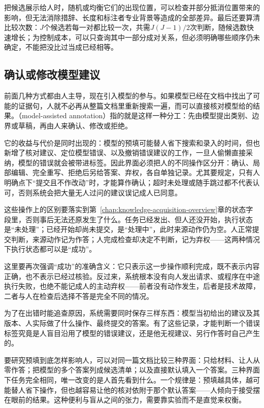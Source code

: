 把候选展示给人时，随机或均衡它们的出现位置，可以检查并部分抵消位置带来的影响，但无法消除措辞、长度和标注者专业背景等造成的全部差异。最后还要算清比较次数：$J$个候选若每一对都比较一次，共需$J(J-1)/2$次判断，随候选数快速增长；为控制成本，可以只查询其中一部分成对关系，但必须明确哪些顺序仍未确定，不能把没比过当成已经相等。

\subsection{确认或修改模型建议}
\label{sec:knowledge-acquisition-human-model-suggestion}

前面几种方式都由人主导，现在引入模型的参与。如果模型已经在文档中找出了可能的证据句，人就不必再从整篇文档里重新搜索一遍，而可以直接核对模型给的结果。（model-assisted annotation）指的就是这样一种分工：先由模型提出类别、边界或草稿，再由人来确认、修改或拒绝。

它的收益与代价是同时出现的：模型的预填可能替人省下搜索和录入的时间，但也新增了核对建议、定位模型错误、以及撤销错误建议的工作，一旦人偷懒直接采纳，模型的错误就会被带进标签。因此界面必须把人的不同操作区分开：确认、局部编辑、完全重写、拒绝后另给答案、弃权，各自单独记录。尤其要规定，只有人明确点下“提交且不作改动”时，才能算作确认；超时未处理或随手跳过都不代表认可，否则系统会把大量无人过问的建议误记成人已同意。

这些操作上的区别要落实到第~\ref{chap:knowledge-acquisition-overview}章的状态字段里，否则事后无法还原发生了什么。任务已经发出、但人还没开始，执行状态是“未处理”；已经开始却尚未提交，是“处理中”，此时来源动作仍为空。人正常提交判断，来源动作记为作答；人完成检查却决定不判断，记为弃权——这两种情况下执行状态都可以是“成功”。

这里要再次强调“成功”的准确含义：它只表示这一步操作顺利完成，既不表示内容正确，也不表示已经过核验。反过来，系统根本没有向人发出请求、或程序在中途执行失败，也绝不能记成人的主动弃权——前者没有动作发生，后者是技术故障，二者与人在检查后选择不答是完全不同的情况。

为了在出错时能追查原因，系统需要同时保存三样东西：模型当初给出的建议及其版本、人实际做了什么操作、最终提交的答案。有了这些记录，才能判断一个错误标签究竟是人盲目沿用了模型的错误建议，还是他无视建议、另行作答时自己产生的。

要研究预填到底怎样影响人，可以对同一篇文档比较三种界面：只给材料、让人从零作答；把模型的多个答案列成候选清单；以及直接默认填入一个答案。三种界面下任务完全相同，唯一改变的是人首先看到什么。一个规律是：预填越具体，越可能替人省下操作，但也越容易让他的核对依附于那个默认答案——人倾向于接受摆在眼前的结果。这种便利与盲从之间的张力，需要靠实验而不是直觉来权衡。


